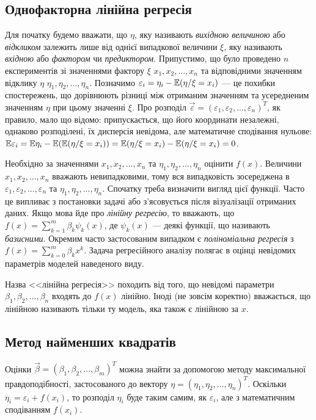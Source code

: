 \subsection{Однофакторна лінійна регресія}
Для початку будемо вважати, що $\eta$, яку називають \emph{вихідною величиною} або \emph{відкликом} залежить лише від однієї випадкової величини $\xi$,
яку називають \emph{вхідною} або \emph{фактором} чи \emph{предиктором}. Припустимо,
що було проведено $n$ експериментів зі значеннями фактору $\xi$ $x_1, x_2, ..., x_n$ та відповідними
значенням відклику $\eta$ $\eta_1, \eta_2, ..., \eta_n$. Позначимо
$\varepsilon_i = \eta_i - \mathbb{E}(\eta / \xi = x_i)$ --- це похибки спостережень, що дорівнюють різниці
між отриманим значенням та усередненим значенням $\eta$ при цьому значенні $\xi$.
Про розподіл $\vec{\varepsilon} = (\varepsilon_1, \varepsilon_2, ..., \varepsilon_n)^T$, як правило, мало що відомо:
припускається, що його координати незалежні, однаково розподілені, їх дисперсія невідома, але математичне сподівання нульове:
$\mathbb{E}\varepsilon_i = \mathbb{E}\eta_i - \mathbb{E}(\mathbb{E}(\eta / \xi = x_i)) = \mathbb{E}(\eta / \xi = x_i) - \mathbb{E}(\eta / \xi = x_i) = 0$.

Необхідно за значеннями $x_1, x_2, ..., x_n$ та $\eta_1, \eta_2, ..., \eta_n$ оцінити $f(x)$.
Величини $x_1, x_2, ..., x_n$ вважають невипадковими, тому вся випадковість зосереджена в
$\varepsilon_1, \varepsilon_2, ..., \varepsilon_n$ та $\eta_1, \eta_2, ..., \eta_n$.
Спочатку треба визначити вигляд цієї функції. Часто це випливає з постановки задачі або з'ясовується після візуалізації отриманих даних.
Якщо мова йде про \emph{лінійну регресію}, то вважають, що
$f(x) = \sum\limits_{k=1}^m \beta_k \psi_k(x)$, де $\psi_k(x)$ --- деякі функції, що називають \emph{базисними}.
Окремим часто застосованим випадком є \emph{поліноміальна регресія} з
$f(x) = \sum\limits_{k=0}^m \beta_k x^k$. Задача регресійного аналізу полягає в оцінці невідомих параметрів моделей наведеного виду.
\begin{remark}
    Назва <<лінійна регресія>> походить від того, що невідомі параметри $\beta_1, \beta_2, ..., \beta_n$ входять до $f(x)$ лінійно.
    Іноді (не зовсім коректно) вважається, що лінійною називають тільки ту модель, яка також
    є лінійною за $x$.
\end{remark}

\subsection{Метод найменших квадратів}
Оцінки $\vec{\beta} = (\beta_1, \beta_2, ..., \beta_m)^T$ можна знайти за допомогою методу максимальної правдоподібності,
застосованого до вектору $\eta = \left(\eta_1, \eta_2, ..., \eta_n\right)^T$.
Оскільки $\eta_i = \varepsilon_i + f(x_i)$, то розподіл $\eta_i$ буде таким самим, як 
$\varepsilon_i$, але з математичним сподіванням $f(x_i)$.

